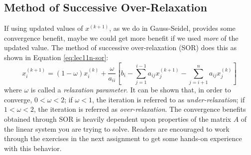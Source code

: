 \subsection{Method of Successive Over-Relaxation}
If using updated values of $x^{(k+1)}$, as we do in Gauss-Seidel, provides some convergence benefit, maybe we could get more benefit if we used \emph{more} of the updated value.  The method of successive over-relaxation (SOR) does this as shown in Equation \ref{eq:lec11n-sor}:
\begin{equation}
x_{i}^{(k+1)} = (1-\omega) x_{i}^{(k)} + \frac{\omega}{a_{ii}}\left[b_{i} - \sum\limits_{j=1}^{i-1}a_{ij}x_{j}^{(k+1)} - \sum\limits_{j=i+1}^{n}a_{ij}x_j^{(k)} \right]
\label{eq:lec11n-sor}
\end{equation}
where $\omega$ is called a \emph{relaxation parameter}.  It can be shown that, in order to converge, $0 < \omega < 2$; if $\omega<1$, the iteration is referred to as \emph{under-relaxation}; if $1 < \omega < 2$, the iteration is referred as \emph{over-relaxation}.  The convergence benefits obtained through SOR is heavily dependent upon properties of the matrix $A$ of the linear system you are trying to solve.  Readers are encouraged to work through the exercises in the next assignment to get some hands-on experience with this behavior.  
